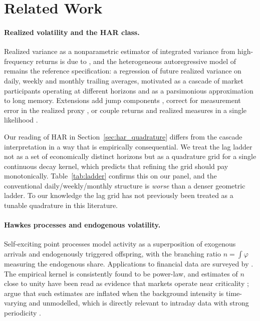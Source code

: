 \section{Related Work}
\label{sec:related_work}

\paragraph{Realized volatility and the HAR class.}
Realized variance as a nonparametric estimator of integrated variance from
high-frequency returns is due to \citet{AndersenBollerslevDieboldLabys2003},
and the heterogeneous autoregressive model of \citet{Corsi2009} remains the
reference specification: a regression of future realized variance on
daily, weekly and monthly trailing averages, motivated as a cascade of
market participants operating at different horizons and as a parsimonious
approximation to long memory. Extensions add jump components
\citep{AndersenBollerslevDiebold2007, BarndorffNielsenShephard2004},
correct for measurement error in the realized proxy
\citep{BollerslevPattonQuaedvlieg2016}, or couple returns and realized
measures in a single likelihood \citep{HansenHuangShek2012}.

Our reading of HAR in Section~\ref{sec:har_quadrature} differs from the
cascade interpretation in a way that is empirically consequential. We treat
the lag ladder not as a set of economically distinct horizons but as a
quadrature grid for a single continuous decay kernel, which predicts that
refining the grid should pay monotonically. Table~\ref{tab:ladder} confirms
this on our panel, and the conventional daily/weekly/monthly structure is
\emph{worse} than a denser geometric ladder. To our knowledge the lag grid has
not previously been treated as a tunable quadrature in this literature.

\paragraph{Hawkes processes and endogenous volatility.}
Self-exciting point processes \citep{Hawkes1971, HawkesOakes1974} model
activity as a superposition of exogenous arrivals and endogenously triggered
offspring, with the branching ratio $n = \int \varphi$ measuring the
endogenous share. Applications to financial data are surveyed by
\citet{BacryMastromatteoMuzy2015}. The empirical kernel is consistently found
to be power-law, and estimates of $n$ close to unity have been read as
evidence that markets operate near criticality
\citep{HardimanBercotBouchaud2013}; \citet{FilimonovSornette2012} argue that
such estimates are inflated when the background intensity is time-varying and
unmodelled, which is directly relevant to intraday data with strong
periodicity \citep{AndersenBollerslev1997}.


